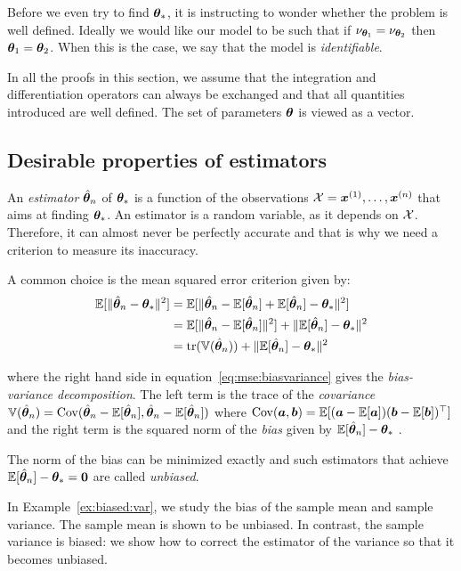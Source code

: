 Before we even try to find $\boldsymbol{\theta}_*$, it is instructing to wonder whether the
problem is well defined. Ideally we would like our model to be such that if
$\nu_{\boldsymbol{\theta}_1} = \nu_{\boldsymbol{\theta}_2}$ then $\boldsymbol{\theta}_1=\boldsymbol{\theta}_2$.
When this is the case, we say that the model is \emph{identifiable}.

In all the proofs in this section, we assume that the integration and
differentiation operators can always be exchanged and that all quantities
introduced are well defined. The set of parameters $\boldsymbol{\theta}$ is viewed as a
vector.

\subsection{Desirable properties of estimators}
\label{sec:desirable}
An \emph{estimator} $\hat{\boldsymbol{\theta}}_n$ of $\boldsymbol{\theta}_*$ is a function of the
observations $\mathcal{X} = \boldsymbol{x}^{(1)}, \dots, \boldsymbol{x}^{(n)}$ that aims at finding $\boldsymbol{\theta}_*$.
An estimator is a random variable, as it depends on $\mathcal{X}$. Therefore, it can almost never be perfectly accurate and that
is why we need a criterion to measure its inaccuracy.

A common choice is the mean squared error criterion given by:
\begin{align}
  \mathbb{E}[\|\hat{\boldsymbol{\theta}}_n - \boldsymbol{\theta}_*\|^2] &= \mathbb{E}[\|\hat{\boldsymbol{\theta}}_n - \mathbb{E}[\hat{\boldsymbol{\theta}}_n] + \mathbb{E}[\hat{\boldsymbol{\theta}}_n] - \boldsymbol{\theta}_*\|^2] \\
                                   &= \mathbb{E}[\|\hat{\boldsymbol{\theta}}_n - \mathbb{E}[\hat{\boldsymbol{\theta}}_n]\|^2] + \|\mathbb{E}[\hat{\boldsymbol{\theta}}_n] - \boldsymbol{\theta}_*\|^2  \\
                                         &= \mathop{\mathrm{tr}}(\mathbb{V}(\hat{\boldsymbol{\theta}}_n)) + \|\mathbb{E}[\hat{\boldsymbol{\theta}}_n] - \boldsymbol{\theta}_*\|^2 \label{eq:mse:biasvariance}
\end{align}

where the right hand side in equation~\ref{eq:mse:biasvariance} gives the
\emph{bias-variance decomposition}. The left term is the trace of the \emph{covariance} $\mathbb{V}(\hat{\boldsymbol{\theta}}_n) = \operatorname*{Cov}(\hat{\boldsymbol{\theta}}_n -
\mathbb{E}[\hat{\boldsymbol{\theta}}_n], \hat{\boldsymbol{\theta}}_n -
\mathbb{E}[\hat{\boldsymbol{\theta}}_n])$ where $\operatorname*{Cov}(\boldsymbol{a}, \boldsymbol{b}) = \mathbb{E}[(\boldsymbol{a} - \mathbb{E}[\boldsymbol{a}]) (\boldsymbol{b} -
\mathbb{E}[\boldsymbol{b}])^{\top}]$ and the right term is the squared norm of the \emph{bias} given by $\mathbb{E}[\hat{\boldsymbol{\theta}}_n] - \boldsymbol{\theta}_*$ .

The norm of the bias can be minimized exactly and such estimators that achieve $\mathbb{E}[\hat{\boldsymbol{\theta}}_n] - \boldsymbol{\theta}_* = \boldsymbol{0}$ are called \emph{unbiased}.

In Example~\ref{ex:biased:var}, we study the bias of the sample mean and sample variance. The sample mean is shown to be unbiased. In
contrast, the sample variance is biased: we show how to
correct the estimator of the variance so that it becomes unbiased.


